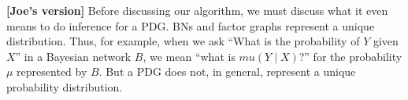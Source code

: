 \documentclass[twoside]{article}
\begin{document}
{\color{red!50!black}\textbf{[Joe's version]}
Before discussing our algorithm, we must discuss what it even means to do inference for a PDG.  BNs and factor graphs represent a unique distribution. Thus, for example, when we ask ``What is the probability of $Y$ given $X$'' in a Bayesian network $B$, we mean ``what is $mu(Y \mid X)$?'' for the probability $\mu$ represented by $B$.  But a PDG does not, in general, represent a unique probability distribution.

}
\end{document}

